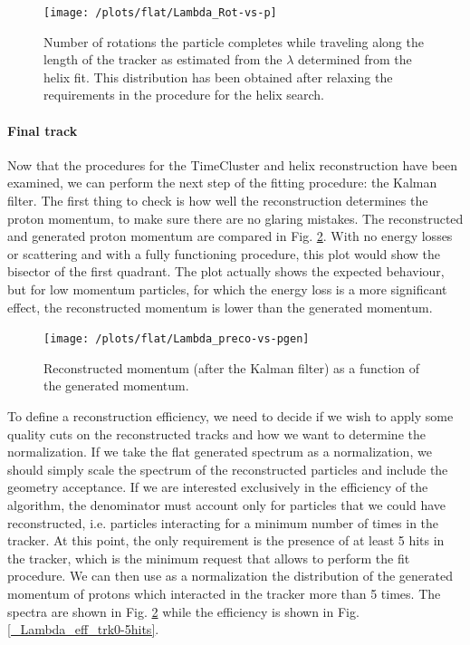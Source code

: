 \documentclass[12pt,a4paper,openright, oneside, titlepage]{book} %
\begin{document}
\begin{figure}[!htb]
\centering
\texttt{[image: /plots/flat/Lambda\_Rot-vs-p]}
\caption[Number or full rotation in the tracker per generated momentum]
{Number of rotations the particle completes while traveling along the length of the tracker 
as estimated from the $\lambda$ determined from the helix fit. 
This distribution has been obtained after relaxing the requirements in the procedure for the helix search.}
\label{_Lambda_Rot-vs-p}
\end{figure}

\paragraph{Final track}
Now that the procedures for the TimeCluster and helix reconstruction have been examined, 
we can perform the next step of the fitting procedure: the Kalman filter. 
The first thing to check is how well the reconstruction determines the proton momentum, 
to make sure there are no glaring mistakes. 
The reconstructed and generated proton momentum 
are compared in Fig. \ref{_Lambda_preco-vs-pgen}. 
With no energy losses or scattering and with a fully functioning procedure, 
this plot would show the bisector of the first quadrant. 
The plot actually shows the expected behaviour, 
but for low momentum particles, 
for which the energy loss is a more significant effect, 
the reconstructed momentum is lower than the generated momentum. 

\begin{figure}[!htb]
\centering
\texttt{[image: /plots/flat/Lambda\_preco-vs-pgen]}
\caption[Reconstructed vs generated momentum (flat protons)]
{Reconstructed momentum (after the Kalman filter) as a function of the generated momentum.}
\label{_Lambda_preco-vs-pgen}
\end{figure}

\noindent To define a reconstruction efficiency, 
we need to decide if we wish to apply some quality cuts 
on the reconstructed tracks and how we want to determine the normalization. 
If we take the flat generated spectrum as a normalization, 
we should simply scale the spectrum of the reconstructed particles 
and include the geometry acceptance. 
If we are interested exclusively in the efficiency of the algorithm, 
the denominator must account only for particles that we could have reconstructed, 
i.e. particles interacting for a minimum number of times in the tracker. 
At this point, the only requirement is the presence of at least 5 hits in the tracker, 
which is the minimum request that allows to perform the fit procedure. 
We can then use as a normalization the distribution of the generated momentum 
of protons which interacted in the tracker more than 5 times. 
The spectra are shown in Fig. \ref{_Lambda_preco-vs-pgen} 
while the efficiency is shown in Fig. \ref{_Lambda_eff_trk0-5hits}.\\
\end{document}
